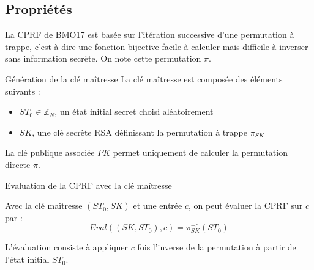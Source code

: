 \documentclass[9pt]{extarticle}
\begin{document}
\subsection{Propriétés}

La CPRF de BMO17 est basée sur l'itération successive d'une permutation à trappe,
c’est-à-dire une fonction bijective facile à calculer mais difficile à inverser sans information secrète.
On note cette permutation $\pi$.

\begin{defbox}{Génération de la clé maîtresse}
La clé maîtresse est composée des éléments suivants :
\begin{itemize}
  \item $ST_0 \in \mathbb{Z}_N$, un état initial secret choisi aléatoirement
  \item $SK$, une clé secrète RSA définissant la permutation à trappe $\pi_{SK}$
\end{itemize}
La clé publique associée $PK$ permet uniquement de calculer la permutation directe $\pi$.
\end{defbox}

\begin{defbox}{Evaluation de la CPRF avec la clé maîtresse}
    
Avec la clé maîtresse $(ST_0, SK)$ et une entrée $c$, on peut évaluer la CPRF sur $c$ par :
\[
Eval((SK, ST_0), c) = \pi_{SK}^{-c}(ST_0)
\]

L’évaluation consiste à appliquer $c$ fois l’inverse de la permutation à partir de l’état initial $ST_0$.

\begin{center}
\end{center}

\end{defbox}
\end{document}
